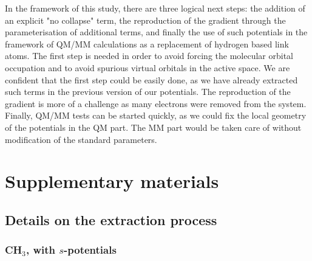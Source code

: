 \documentclass[aip]{revtex4-1}
\begin{document}
In the framework of this study, there are three logical next steps: the addition of an explicit
"no collapse" term, the reproduction of the gradient through the parameterisation
of additional terms, and finally the use of such potentials in the framework
of QM/MM calculations as a replacement of hydrogen based link atoms.
The first step is needed in order to avoid forcing the molecular orbital occupation and
to avoid spurious virtual orbitals in the active space.
We are confident that the first step could be easily done, as we have already extracted such
terms in the previous version of our potentials.
The reproduction of the gradient is more of a challenge as many electrons were removed from the system.
Finally, QM/MM tests can be started quickly, as we could fix the local geometry of the potentials
in the QM part. The MM part would be taken care of without modification of the standard parameters.



%
%



\clearpage
\section{Supplementary materials}
\subsection{Details on the extraction process}
\subsubsection{CH\(_{3}\), with \(s\)-potentials}
\end{document}
